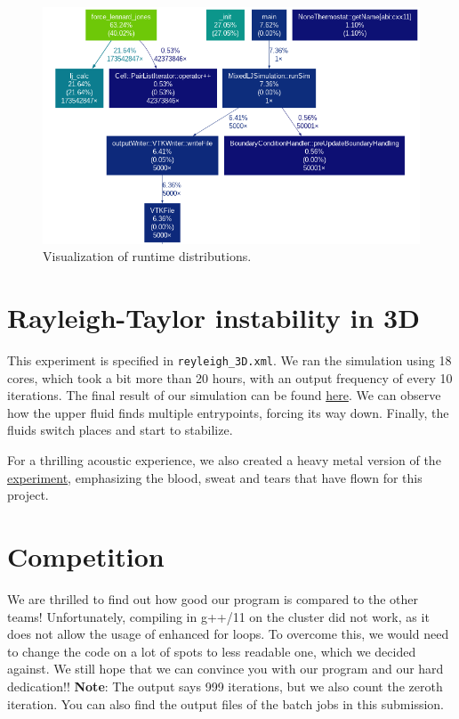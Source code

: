 \documentclass{article}
\begin{document}
\begin{figure}[H]
    \centering
    \includegraphics[width=1\textwidth]{../../res/optimized.png}
    \caption{Visualization of runtime distributions.}
    \label{fig:runtime}
\end{figure}

\section{Rayleigh-Taylor instability in 3D}
This experiment is specified in \texttt{reyleigh\_3D.xml}.
We ran the simulation using 18 cores, which took a bit more than 20 hours, with an output frequency of every 10 iterations.
The final result of our simulation can be found \href{https://www.youtube.com/watch?v=DXrORoIFdDM}{here}.
We can observe how the upper fluid finds multiple entrypoints, forcing its way down.
Finally, the fluids switch places and start to stabilize.


For a thrilling acoustic experience, we also created a heavy metal version of the \href{https://youtu.be/U99R1vSeBxQ}{experiment}, emphasizing the blood, sweat and tears that have flown for this project.

\section{Competition}
We are thrilled to find out how good our program is compared to the other teams!
Unfortunately, compiling in g++/11 on the cluster did not work, as it does not allow the usage of enhanced for loops.
To overcome this, we would need to change the code on a lot of spots to less readable one, which we decided against. 
We still hope that we can convince you with our program and our hard dedication!!
\textbf{Note}: The output says 999 iterations, but we also count the zeroth iteration. 
You can also find the output files of the batch jobs in this submission.
\end{document}

